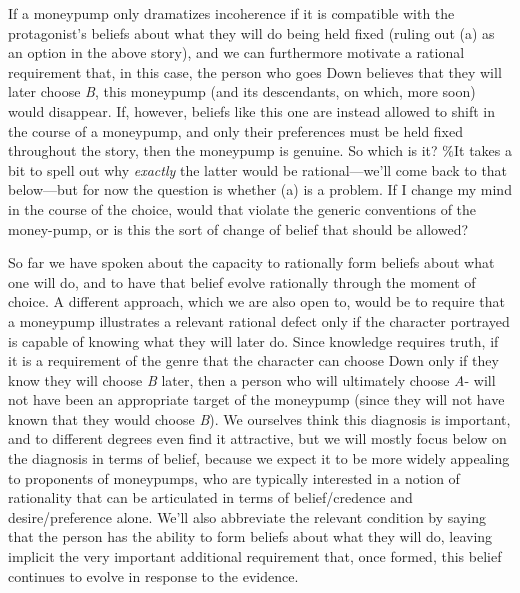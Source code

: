\documentclass[
  11pt,
  letterpaper,
  DIV=11,
  numbers=noendperiod,
  twoside]{scrartcl}
\begin{document}
If a moneypump only dramatizes incoherence if it is compatible with the
protagonist's beliefs about what they will do being held fixed (ruling
out (a) as an option in the above story), and we can furthermore
motivate a rational requirement that, in this case, the person who goes
Down believes that they will later choose \emph{B}, this moneypump (and
its descendants, on which, more soon) would disappear. If, however,
beliefs like this one are instead allowed to shift in the course of a
moneypump, and only their preferences must be held fixed throughout the
story, then the moneypump is genuine. So which is it? \%It takes a bit
to spell out why \emph{exactly} the latter would be rational---we'll
come back to that below---but for now the question is whether (a) is a
problem. If I change my mind in the course of the choice, would that
violate the generic conventions of the money-pump, or is this the sort
of change of belief that should be allowed?

So far we have spoken about the capacity to rationally form beliefs
about what one will do, and to have that belief evolve rationally
through the moment of choice. A different approach, which we are also
open to, would be to require that a moneypump illustrates a relevant
rational defect only if the character portrayed is capable of knowing
what they will later do. Since knowledge requires truth, if it is a
requirement of the genre that the character can choose Down only if they
know they will choose \emph{B} later, then a person who will ultimately
choose \emph{A}- will not have been an appropriate target of the
moneypump (since they will not have known that they would choose
\emph{B}). We ourselves think this diagnosis is important, and to
different degrees even find it attractive, but we will mostly focus
below on the diagnosis in terms of belief, because we expect it to be
more widely appealing to proponents of moneypumps, who are typically
interested in a notion of rationality that can be articulated in terms
of belief/credence and desire/preference alone. We'll also abbreviate
the relevant condition by saying that the person has the ability to form
beliefs about what they will do, leaving implicit the very important
additional requirement that, once formed, this belief continues to
evolve in response to the evidence.
\end{document}
